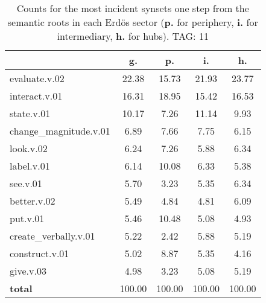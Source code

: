 \begin{table}[h!]
\begin{center}
\begin{tabular}{| l || c | c | c | c |}\hline
 & {\bf g.} & {\bf p.} & {\bf i.} & {\bf h.} \\\hline\hline
evaluate.v.02 & 22.38  & 15.73  & 21.93  & 23.77 \\\hline
interact.v.01 & 16.31  & 18.95  & 15.42  & 16.53 \\\hline
state.v.01 & 10.17  & 7.26  & 11.14  & 9.93 \\\hline
change\_magnitude.v.01 & 6.89  & 7.66  & 7.75  & 6.15 \\\hline
look.v.02 & 6.24  & 7.26  & 5.88  & 6.34 \\\hline
label.v.01 & 6.14  & 10.08  & 6.33  & 5.38 \\\hline
see.v.01 & 5.70  & 3.23  & 5.35  & 6.34 \\\hline
better.v.02 & 5.49  & 4.84  & 4.81  & 6.09 \\\hline
put.v.01 & 5.46  & 10.48  & 5.08  & 4.93 \\\hline
create\_verbally.v.01 & 5.22  & 2.42  & 5.88  & 5.19 \\\hline
construct.v.01 & 5.02  & 8.87  & 5.35  & 4.16 \\\hline
give.v.03 & 4.98  & 3.23  & 5.08  & 5.19 \\\hline\hline
{{\bf total}} & 100.00  & 100.00  & 100.00  & 100.00 \\\hline
\end{tabular}
\caption{Counts for the most incident synsets one step from the semantic roots in each Erd\"os sector ({\bf p.} for periphery, {\bf i.} for intermediary, {\bf h.} for hubs). TAG: 11}
\end{center}
\end{table}